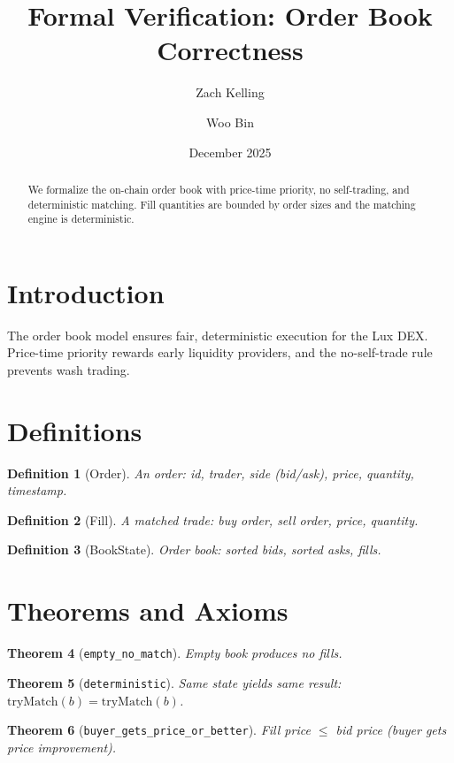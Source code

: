 \documentclass[11pt]{article}
\title{Formal Verification: Order Book Correctness}
\author{Zach Kelling \and Woo Bin}
\date{December 2025}
\newtheorem{theorem}{Theorem}
\newtheorem{definition}[theorem]{Definition}
\begin{document}
\maketitle

\begin{abstract}
We formalize the on-chain order book with price-time priority, no self-trading, and deterministic matching. Fill quantities are bounded by order sizes and the matching engine is deterministic.
\end{abstract}

\section{Introduction}
The order book model ensures fair, deterministic execution for the Lux DEX. Price-time priority rewards early liquidity providers, and the no-self-trade rule prevents wash trading.

\section{Definitions}
\begin{definition}[Order]
An order: id, trader, side (bid/ask), price, quantity, timestamp.
\end{definition}

\begin{definition}[Fill]
A matched trade: buy order, sell order, price, quantity.
\end{definition}

\begin{definition}[BookState]
Order book: sorted bids, sorted asks, fills.
\end{definition}


\section{Theorems and Axioms}
\begin{theorem}[\texttt{empty\_no\_match}]
Empty book produces no fills.
\end{theorem}

\begin{theorem}[\texttt{deterministic}]
Same state yields same result: $\text{tryMatch}(b) = \text{tryMatch}(b)$.
\end{theorem}

\begin{theorem}[\texttt{buyer\_gets\_price\_or\_better}]
Fill price $\leq$ bid price (buyer gets price improvement).
\end{theorem}
\end{document}
